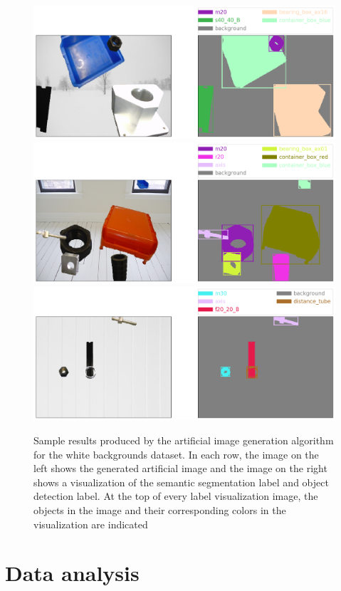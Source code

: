 	\begin{figure}
		\centering
		\includegraphics[scale=0.3]{images/sample_white_1}
		\includegraphics[scale=0.3]{images/sample_white_2}
		\includegraphics[scale=0.3]{images/sample_white_3}
		\caption{Sample results produced by the artificial image generation algorithm for the white backgrounds dataset. In each row, the image on the left shows the generated artificial image and the image on the right shows a visualization of the semantic segmentation label and object detection label. At the top of every label visualization image, the objects in the image and their corresponding colors in the visualization are indicated}
		\label{Fig:samplewhite}
	\end{figure}
	
\section{Data analysis}
\label{section:analysis}

